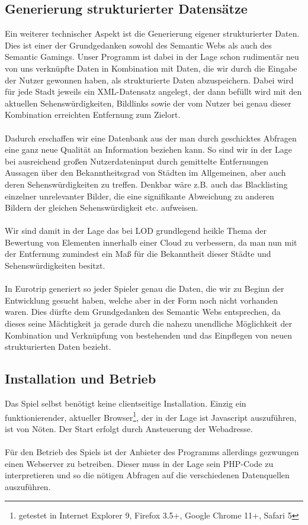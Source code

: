 \documentclass[a4paper, 11pt]{article}
\begin{document}
\subsection{Generierung strukturierter Datensätze}
\label{sec:gen-struk-daten}
Ein weiterer technischer Aspekt ist die Generierung eigener strukturierter Daten. Dies ist einer der Grundgedanken sowohl des Semantic Webs als auch des Semantic Gamings. Unser Programm ist dabei in der Lage schon rudimentär neu von uns verknüpfte Daten in Kombination mit Daten, die wir durch die Eingabe der Nutzer gewonnen haben, als strukturierte Daten abzuspeichern. Dabei wird für jede Stadt jeweils ein XML-Datensatz angelegt, der dann befüllt wird mit den aktuellen Sehenswürdigkeiten, Bildlinks sowie der vom Nutzer bei genau dieser Kombination erreichten Entfernung zum Zielort.\\\\ Dadurch erschaffen wir eine Datenbank aus der man durch geschicktes Abfragen eine ganz neue Qualität an Information beziehen kann. So sind wir in der Lage bei ausreichend großen Nutzerdateninput durch gemittelte Entfernungen Aussagen über den Bekanntheitsgrad von Städten im Allgemeinen, aber auch deren Sehenswürdigkeiten zu treffen. Denkbar wäre z.B. auch das Blacklisting einzelner unrelevanter Bilder, die eine signifikante Abweichung zu anderen Bildern der gleichen Sehenswürdigkeit etc. aufweisen.\\\\
Wir sind damit in der Lage das bei LOD grundlegend heikle Thema der Bewertung von Elementen innerhalb einer Cloud zu verbessern, da man nun mit der Entfernung zumindest ein Maß für die Bekanntheit dieser Städte und Sehenswürdigkeiten besitzt.\\\\
In Eurotrip generiert so jeder Spieler genau die Daten, die wir zu Beginn der Entwicklung gesucht haben, welche aber in der Form noch nicht vorhanden waren. Dies dürfte dem Grundgedanken des Semantic Webs entsprechen, da dieses seine Mächtigkeit ja gerade durch die nahezu unendliche Möglichkeit der Kombination und Verknüpfung von bestehenden und das Einpflegen von neuen strukturierten Daten bezieht.
\subsection{Installation und Betrieb}
Das Spiel selbst benötigt keine clientseitige Installation. Einzig ein funktionierender, aktueller Browser\footnote{getestet in Internet Explorer 9, Firefox 3.5+, Google Chrome 11+, Safari 5}, der in der Lage ist Javascript auszuführen, ist von Nöten. Der Start erfolgt durch Ansteuerung der Webadresse.\\\\
Für den Betrieb des Spiels ist der Anbieter des Programms allerdings gezwungen einen Webserver zu betreiben. Dieser muss in der Lage sein PHP-Code zu interpretieren und so die nötigen Abfragen auf die verschiedenen Datenquellen auszuführen.
\newpage
\end{document}
